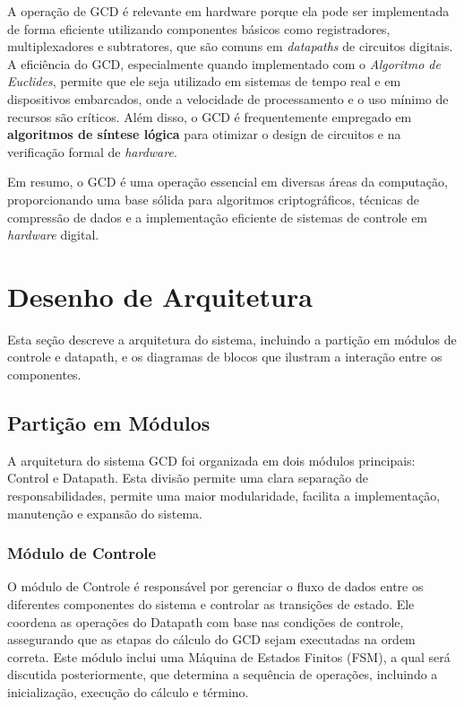 \documentclass[a4paper,11pt]{article} %
\begin{document}
A operação de GCD é relevante em hardware porque ela pode ser implementada de forma eficiente utilizando componentes básicos como registradores, multiplexadores e subtratores, que são comuns em \textit{datapaths} de circuitos digitais. A eficiência do GCD, especialmente quando implementado com o \textit{Algoritmo de Euclides}, permite que ele seja utilizado em sistemas de tempo real e em dispositivos embarcados, onde a velocidade de processamento e o uso mínimo de recursos são críticos. Além disso, o GCD é frequentemente empregado em \textbf{algoritmos de síntese lógica} para otimizar o design de circuitos e na verificação formal de \textit{hardware}.

Em resumo, o GCD é uma operação essencial em diversas áreas da computação, proporcionando uma base sólida para algoritmos criptográficos, técnicas de compressão de dados e a implementação eficiente de sistemas de controle em \textit{hardware} digital.


\section{Desenho de Arquitetura}
Esta seção descreve a arquitetura do sistema, 
incluindo a partição em módulos de controle e datapath, 
e os diagramas de blocos que ilustram a interação entre os componentes.

\subsection{Partição em Módulos}
A arquitetura do sistema GCD foi organizada em dois módulos principais: Control e Datapath.
Esta divisão permite uma clara separação de responsabilidades, permite 
uma maior modularidade, 
facilita a implementação, manutenção e expansão do sistema.

\subsubsection{Módulo de Controle}
O módulo de Controle é responsável por gerenciar o fluxo de dados 
entre os diferentes componentes do sistema e controlar as transições de estado. 
Ele coordena as operações do Datapath com base nas condições de controle, 
assegurando que as etapas do cálculo do GCD sejam executadas na ordem correta. 
Este módulo inclui uma Máquina de Estados Finitos (FSM), a qual será discutida posteriormente,
que determina a sequência de operações, incluindo a inicialização, 
execução do cálculo e término.
\end{document}
